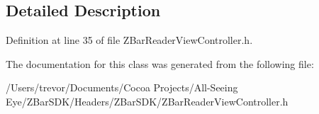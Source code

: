 \subsection{Detailed Description}


Definition at line 35 of file ZBarReaderViewController.h.



The documentation for this class was generated from the following file:\begin{DoxyCompactItemize}
\item 
/Users/trevor/Documents/Cocoa Projects/All-\/Seeing Eye/ZBarSDK/Headers/ZBarSDK/ZBarReaderViewController.h\end{DoxyCompactItemize}
